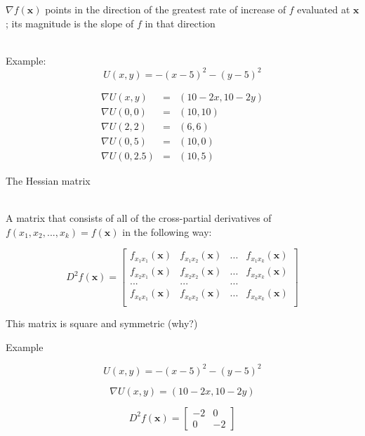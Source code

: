 \documentclass[10pt]{seminar}
\begin{document}
\begin{slide}
\newslide
$\nabla f(\mathbf{x})$ points in the direction of the greatest rate of increase of $f$ evaluated at $\mathbf{x}$; its magnitude is the slope of $f$ in that direction

\ \\Example: $$U(x, y)=-(x-5)^2-(y-5)^2$$

\begin{center}
\end{center}

\newslide

\begin{center}
\end{center}

$$\begin{array}{lcl}
\nabla U(x, y)&=&(10-2x, 10-2y)\\
\nabla U(0, 0)&=&(10, 10)\\
\nabla U(2, 2)&=&(6, 6)\\
\nabla U(0, 5)&=&(10, 0)\\
\nabla U(0, 2.5)&=&(10, 5)\end{array}$$

\newslide
The Hessian matrix

\ \\A matrix that consists of all of the cross-partial derivatives of $f(x_1, x_2, ..., x_k) = f(\mathbf{x})$ in the following way:

$$D^2f(\mathbf{x})= \begin{bmatrix}
f_{x_1x_1}(\mathbf{x})& f_{x_1x_2}(\mathbf{x})& ...& f_{x_1x_k}(\mathbf{x})\\
f_{x_2x_1}(\mathbf{x})& f_{x_2x_2}(\mathbf{x})& ...& f_{x_2x_k}(\mathbf{x})\\
...&...&...&\\

f_{x_kx_1}(\mathbf{x})& f_{x_kx_2}(\mathbf{x})& ...& f_{x_kx_k}(\mathbf{x})\\


\end{bmatrix}$$

This matrix is square and symmetric (why?)

\newslide
Example

 $$U(x, y)=-(x-5)^2-(y-5)^2$$
 
$$ \nabla U(x, y)=(10-2x, 10-2y)$$

$$D^2 f(\mathbf{x}) =\begin{bmatrix}
-2 & 0\\ 0& -2
\end{bmatrix}$$


\end{slide}
\end{document}
